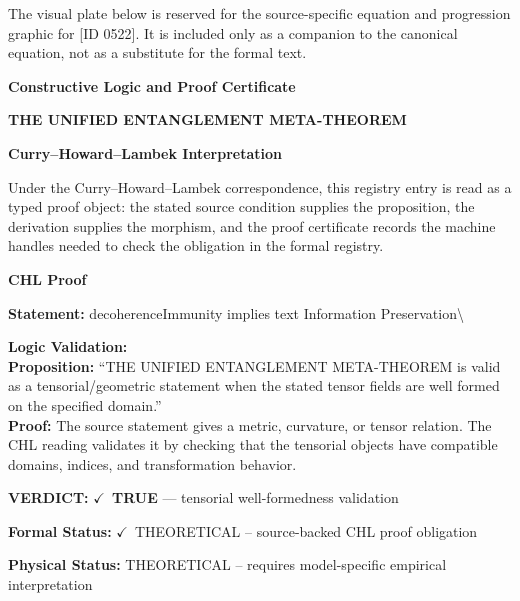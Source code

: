 \begingroup\footnotesize\sloppy
The visual plate below is reserved for the source-specific equation and progression graphic for [ID 0522]. It is included only as a companion to the canonical equation, not as a substitute for the formal text.
\par\endgroup
\ifTZPDarkEdition
{}
\fi

\clearpage
\begingroup\tzpsupportsetup
\noindent\textbf{\fontsize{10.8pt}{12.8pt}\selectfont [ID 0522] Constructive Logic and Proof Certificate}\par
\noindent\textbf{\fontsize{10pt}{12pt}\selectfont THE UNIFIED ENTANGLEMENT META-THEOREM}\par
\vspace{0.45em}
\begingroup
\footnotesize
\setlength{\parskip}{0.22em}
\setlength{\parindent}{0pt}
\noindent\textbf{Curry--Howard--Lambek Interpretation}\par
Under the Curry--Howard--Lambek correspondence, this registry entry is read as a typed proof
object: the stated source condition supplies the proposition, the derivation supplies the
morphism, and the proof certificate records the machine handles needed to check the obligation
in the formal registry.

\vspace{0.45em}
\noindent\textbf{CHL Proof}\par
\textbf{Statement:} decoherenceImmunity implies text Information Preservation\textbackslash{}

\textbf{Logic Validation:}\\
\textbf{Proposition:} ``THE UNIFIED ENTANGLEMENT META-THEOREM is valid as a tensorial/geometric statement when
the stated tensor fields are well formed on the specified domain.''\\
\textbf{Proof:} The source statement gives a metric, curvature, or tensor relation. The CHL reading
validates it by checking that the tensorial objects have compatible domains, indices,
and transformation behavior.

\textbf{VERDICT:} \ensuremath{\checkmark}\ \textbf{TRUE} --- tensorial well-formedness validation

\textbf{Formal Status:} \ensuremath{\checkmark}\ THEORETICAL -- source-backed CHL proof obligation

\textbf{Physical Status:} THEORETICAL -- requires model-specific empirical interpretation
\par\vspace{0.45em}
\par
\ifTZPDarkEdition
{}
\fi
\endgroup
\endgroup

